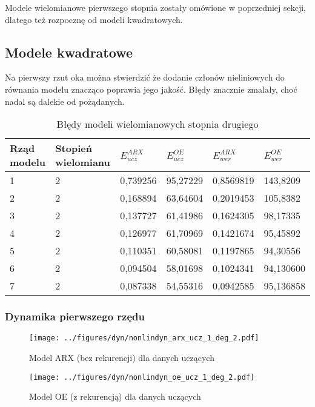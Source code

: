 \documentclass[a4paper,titlepage,11pt,floatssmall]{mwrep}
\begin{document}
Modele wielomianowe pierwszego stopnia zostały omówione w poprzedniej sekcji, dlatego też rozpocznę od modeli kwadratowych.

\subsection{Modele kwadratowe}
Na pierwszy rzut oka można stwierdzić że dodanie członów nieliniowych do równania modelu znacząco poprawia jego jakość. Błędy znacznie zmalały, choć nadal są dalekie od pożądanych. 

\begin{table}[H]
\centering
\caption{Błędy modeli wielomianowych stopnia drugiego}
\begin{tabular}{|l|l|l|l|l|l|}
\hline
Rząd modelu & Stopień wielomianu & $ E_{ucz}^{ARX}$     & $E_{ucz}^{OE}$    & $E_{wer}^{ARX}$     &$ E_{wer}^{OE} $    \\ \hline
1           & 2                  & 0,739256 & 95,27229 & 0,8569819  & 143,8209 \\ \hline
2           & 2                  & 0,168894 & 63,64604 & 0,2019453  & 105,8382 \\ \hline
3           & 2                  & 0,137727 & 61,41986 & 0,1624305  & 98,17335 \\ \hline
4           & 2                  & 0,126977 & 61,70969 & 0,1421674  & 95,45892 \\ \hline
5           & 2                  & 0,110351 & 60,58081 & 0,1197865  & 94,30556 \\ \hline
6           & 2                  & 0,094504 & 58,01698 & 0,1024341 & 94,130600 \\ \hline
7           & 2                  & 0,087338 & 54,55316 & 0,0942585 & 95,136858 \\ \hline
\end{tabular}
\end{table}

\newpage
\subsubsection{Dynamika pierwszego rzędu}
\begin{figure}[H]
\centering
\texttt{[image: ../figures/dyn/nonlindyn\_arx\_ucz\_1\_deg\_2.pdf]}
\caption{Model ARX (bez rekurencji) dla danych uczących}
\end{figure}

\begin{figure}[H]
\centering
\texttt{[image: ../figures/dyn/nonlindyn\_oe\_ucz\_1\_deg\_2.pdf]}
\caption{Model OE (z rekurencją) dla danych uczących}
\end{figure}
\end{document}
